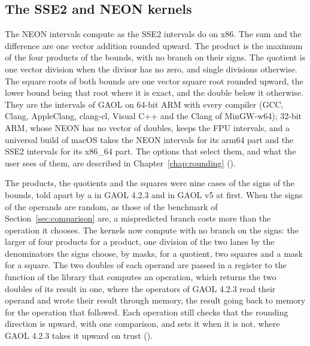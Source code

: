 \documentclass[12pt,a4paper,twoside,openright]{book}
\begin{document}
\subsection{The SSE2 and NEON kernels}

The NEON intervals compute as the SSE2 intervals do on
x86.\newinvfive{} The sum and the difference are one vector addition rounded
upward. The product is the maximum of the four products of the bounds, with
no branch on their signs. The quotient is one vector division when the
divisor has no zero, and single divisions otherwise. The square roots of
both bounds are one vector square root rounded upward, the lower bound being
that root where it is exact, and the double below it otherwise. They are the
intervals of GAOL on 64-bit ARM with every compiler (GCC, Clang, AppleClang,
clang-cl, Visual C++ and the Clang of MinGW-w64); 32-bit ARM, whose NEON has
no vector of doubles, keeps the FPU intervals, and a universal build of
macOS takes the NEON intervals for its arm64 part and the SSE2 intervals for
its x86\_64 part. The options that select them, and what the user sees of
them, are described in Chapter~\ref{chap:rounding} ().

\medskip
The products, the quotients and the squares were nine cases of the signs of
the bounds, told apart by a  in GAOL 4.2.3 and in GAOL v5 at
first. When the signs of the operands are random, as those of the benchmark
of Section~\ref{sec:comparison} are, a mispredicted branch costs more than
the operation it chooses. The kernels now compute with no branch on the
signs:\newinvfive{} the larger of four products for a product, one division
of the two lanes by the denominators the signs choose, by masks, for a
quotient, two squares and a mask for a square. The two doubles of each operand
are passed in a register to the function of the library that computes an
operation, which returns the two doubles of its result in one, where the
operators of GAOL 4.2.3 read their operand and wrote their result through
memory, the result going back to memory for the operation that followed.
Each operation still checks that the rounding direction is upward, with one
comparison, and sets it when it is not, where GAOL 4.2.3 takes it upward on
trust ().
\end{document}
